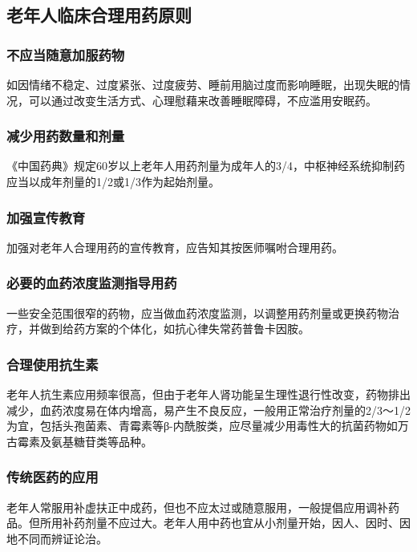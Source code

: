 \subsection{老年人临床合理用药原则}

\subsubsection{不应当随意加服药物}

如因情绪不稳定、过度紧张、过度疲劳、睡前用脑过度而影响睡眠，出现失眠的情况，可以通过改变生活方式、心理慰藉来改善睡眠障碍，不应滥用安眠药。

\subsubsection{减少用药数量和剂量}

《中国药典》规定60岁以上老年人用药剂量为成年人的3/4，中枢神经系统抑制药应当以成年剂量的1/2或1/3作为起始剂量。

\subsubsection{加强宣传教育}

加强对老年人合理用药的宣传教育，应告知其按医师嘱咐合理用药。

\subsubsection{必要的血药浓度监测指导用药}

一些安全范围很窄的药物，应当做血药浓度监测，以调整用药剂量或更换药物治疗，并做到给药方案的个体化，如抗心律失常药普鲁卡因胺。

\subsubsection{合理使用抗生素}

老年人抗生素应用频率很高，但由于老年人肾功能呈生理性退行性改变，药物排出减少，血药浓度易在体内增高，易产生不良反应，一般用正常治疗剂量的2/3～1/2为宜，包括头孢菌素、青霉素等β-内酰胺类，应尽量减少用毒性大的抗菌药物如万古霉素及氨基糖苷类等品种。

\subsubsection{传统医药的应用}

老年人常服用补虚扶正中成药，但也不应太过或随意服用，一般提倡应用调补药品。但所用补药剂量不应过大。老年人用中药也宜从小剂量开始，因人、因时、因地不同而辨证论治。

